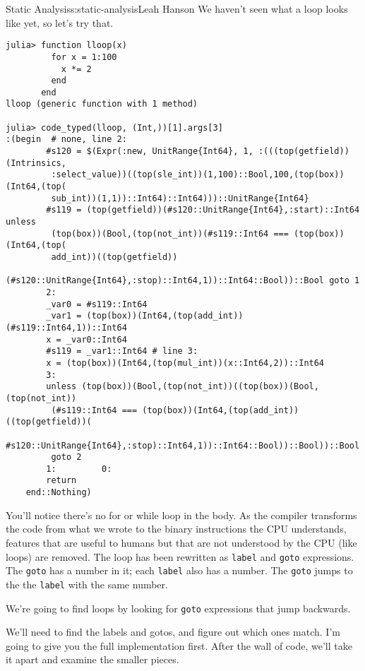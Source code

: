 \begin{aosachapter}{Static Analysis}{s:static-analysis}{Leah Hanson}
We haven't seen what a loop looks like yet, so let's try that.

\begin{verbatim}
julia> function lloop(x)
         for x = 1:100
           x *= 2
         end
       end
lloop (generic function with 1 method)

julia> code_typed(lloop, (Int,))[1].args[3]
:(begin  # none, line 2:
        #s120 = $(Expr(:new, UnitRange{Int64}, 1, :(((top(getfield))(Intrinsics,
         :select_value))((top(sle_int))(1,100)::Bool,100,(top(box))(Int64,(top(
         sub_int))(1,1))::Int64)::Int64)))::UnitRange{Int64}
        #s119 = (top(getfield))(#s120::UnitRange{Int64},:start)::Int64        unless 
         (top(box))(Bool,(top(not_int))(#s119::Int64 === (top(box))(Int64,(top(
         add_int))((top(getfield))
         (#s120::UnitRange{Int64},:stop)::Int64,1))::Int64::Bool))::Bool goto 1
        2: 
        _var0 = #s119::Int64
        _var1 = (top(box))(Int64,(top(add_int))(#s119::Int64,1))::Int64
        x = _var0::Int64
        #s119 = _var1::Int64 # line 3:
        x = (top(box))(Int64,(top(mul_int))(x::Int64,2))::Int64
        3: 
        unless (top(box))(Bool,(top(not_int))((top(box))(Bool,(top(not_int))
         (#s119::Int64 === (top(box))(Int64,(top(add_int))((top(getfield))(
         #s120::UnitRange{Int64},:stop)::Int64,1))::Int64::Bool))::Bool))::Bool
         goto 2
        1:         0: 
        return
    end::Nothing)
\end{verbatim}

You'll notice there's no for or while loop in the body. As the compiler
transforms the code from what we wrote to the binary instructions the
CPU understands, features that are useful to humans but that are not
understood by the CPU (like loops) are removed. The loop has been
rewritten as \texttt{label} and \texttt{goto} expressions. The
\texttt{goto} has a number in it; each \texttt{label} also has a number.
The \texttt{goto} jumps to the the \texttt{label} with the same number.

\label{detecting-and-extracting-loops}

We're going to find loops by looking for \texttt{goto} expressions that
jump backwards.

We'll need to find the labels and gotos, and figure out which ones
match. I'm going to give you the full implementation first. After the
wall of code, we'll take it apart and examine the smaller pieces.


\end{aosachapter}
